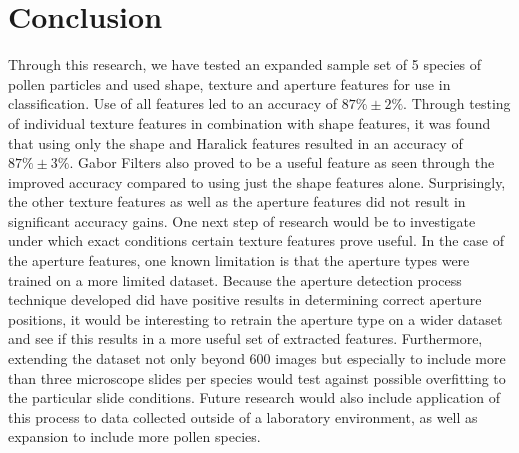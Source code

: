 \section{Conclusion}

Through this research, we have tested an expanded sample set of 5 species of pollen particles and used shape, texture and aperture features for use in classification. Use of all features led to an accuracy of $87\% \pm 2\%$. Through testing of individual texture features in combination with shape features, it was found that using only the shape and Haralick features resulted in an accuracy of $87\% \pm 3\%$. Gabor Filters also proved to be a useful feature as seen through the improved accuracy compared to using just the shape features alone. Surprisingly, the other texture features as well as the aperture features did not result in significant accuracy gains. One next step of research would be to investigate under which exact conditions certain texture features prove useful. In the case of the aperture features, one known limitation is that the aperture types were trained on a more limited dataset. Because the aperture detection process technique developed did have positive results in determining correct aperture positions, it would be interesting to retrain the aperture type on a wider dataset and see if this results in a more useful set of extracted features. Furthermore, extending the dataset not only beyond 600 images but especially to include more than three microscope slides per species would test against possible overfitting to the particular slide conditions. Future research would also include application of this process to data collected outside of a laboratory environment, as well as expansion to include more pollen species.
    
  
  
  
  
  